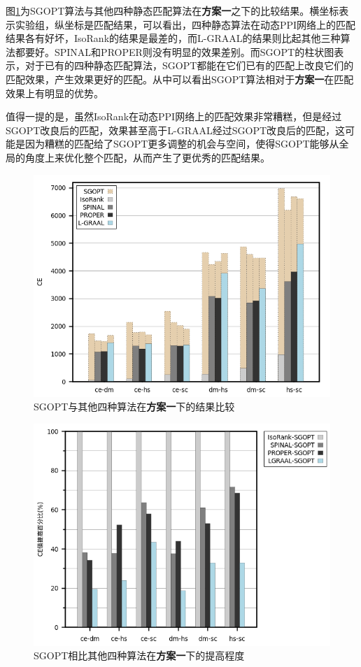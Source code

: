 图\ref{fig:all}为SGOPT算法与其他四种静态匹配算法在\textbf{方案一}之下的比较结果。横坐标表示实验组，纵坐标是匹配结果，可以看出，四种静态算法在动态PPI网络上的匹配结果各有好坏，IsoRank的结果是最差的，而L-GRAAL的结果则比起其他三种算法都要好。SPINAL和PROPER则没有明显的效果差别。而SGOPT的柱状图表示，对于已有的四种静态匹配算法，SGOPT都能在它们已有的匹配上改良它们的匹配效果，产生效果更好的匹配。从中可以看出SGOPT算法相对于\textbf{方案一}在匹配效果上有明显的优势。

值得一提的是，虽然IsoRank在动态PPI网络上的匹配效果非常糟糕，但是经过SGOPT改良后的匹配，效果甚至高于L-GRAAL经过SGOPT改良后的匹配，这可能是因为糟糕的匹配给了SGOPT更多调整的机会与空间，使得SGOPT能够从全局的角度上来优化整个匹配，从而产生了更优秀的匹配结果。

\begin{figure}[htbp]
\centering
\includegraphics[height=0.25\textheight]{pic/all.png}
\caption{SGOPT与其他四种算法在\textbf{方案一}下的结果比较} 
\label{fig:all}
\end{figure}

\begin{figure}[htbp]
\centering
\includegraphics[height=0.25\textheight]{pic/all_improve.png}
\caption{SGOPT相比其他四种算法在\textbf{方案一}下的提高程度} 
\label{fig:all_improve}
\end{figure}

